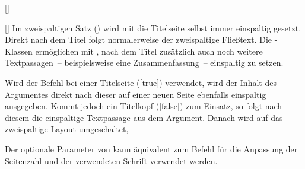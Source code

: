 \begin{Declaration}{%
}
\begin{Declaration}[v2.02]{%
  []%
}
\begin{Declaration}[v2.02]{[\PSet]}
\printdeclarationlist%
%
%
%
%
Im zweispaltigen Satz () wird mit  die 
Titelseite selbst immer einspaltig gesetzt. Direkt nach dem Titel folgt 
normalerweise der zweispaltige Fließtext. Die \TUDScript-Klassen ermöglichen 
mit , nach dem Titel zusätzlich auch noch weitere 
Textpassagen~-- beispielsweise eine Zusammenfassung~-- einspaltig zu setzen.

Wird der Befehl bei einer Titelseite ([true]) verwendet, wird 
der Inhalt des Argumentes direkt nach dieser auf einer neuen Seite ebenfalls 
einspaltig ausgegeben. Kommt jedoch ein Titelkopf ([false]) 
zum Einsatz, so folgt nach diesem die einspaltige Textpassage aus dem Argument. 
Danach wird auf das zweispaltige Layout umgeschaltet, 

Der optionale Parameter von  kann äquivalent zum 
Befehl  für die Anpassung der Seitenzahl und der verwendeten 
Schrift verwendet werden.
\end{Declaration}
\end{Declaration}
\end{Declaration}

